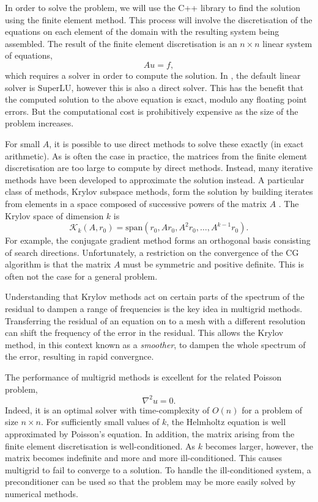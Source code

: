 In order to solve the problem, we will use the C++ library \oomph to find the solution using the finite element method.
This process will involve the discretisation of the equations on each element of the domain with the resulting system being assembled.
The result of the finite element discretisation is an $n\times n$ linear system of equations,
\[
	A u = f,
\]
which requires a solver in order to compute the solution.
In \oomph, the default linear solver is SuperLU, however this is also a direct solver.
This has the benefit that the computed solution to the above equation is exact, modulo any floating point errors.
But the computational cost is prohibitively expensive as the size of the problem increases.

For small $A$, it is possible to use direct methods to solve these exactly (in exact arithmetic).
As is often the case in practice, the matrices from the finite element discretisation are too large to compute by direct methods.
Instead, many iterative methods have been developed to approximate the solution instead.
A particular class of methods, Krylov subspace methods, form the solution by building iterates from elements in a space composed of successive powers of the matrix $A$ \cite{leveque}.
The Krylov space of dimension $k$ is 
\[
	\mathcal{K}_k(A, r_0) = \mathrm{span}(r_0, Ar_0, A^2 r_0, \ldots, A^{k-1} r_0).
\]
For example, the conjugate gradient method forms an orthogonal basis consisting of search directions.
Unfortunately, a restriction on the convergence of the CG algorithm is that the matrix $A$ must be symmetric and positive definite.
This is often not the case for a general problem.

Understanding that Krylov methods act on certain parts of the spectrum of the residual to dampen a range of frequencies is the key idea in multigrid methods.
Transferring the residual of an equation on to a mesh with a different resolution can shift the frequency of the error in the residual.
This allows the Krylov method, in this context known as a \textit{smoother}, to dampen the whole spectrum of the error, resulting in rapid convergnce.

The performance of multigrid methods is excellent for the related Poisson problem,
\begin{equation}
	\nabla^2 u = 0.
\end{equation}
Indeed, it is an optimal solver with time-complexity of $O(n)$ for a problem of size $n\times n$.
For sufficiently small values of $k$, the Helmholtz equation is well approximated by Poisson's equation.
In addition, the matrix arising from the finite element discretisation is well-conditioned.
As $k$ becomes larger, however, the matrix becomes indefinite and more and more ill-conditioned.
This causes multigrid to fail to converge to a solution.
To handle the ill-conditioned system, a preconditioner can be used so that the problem may be more easily solved by numerical methods.

